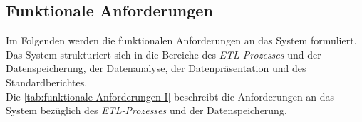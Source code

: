 

\subsection{Funktionale Anforderungen}
Im Folgenden werden die funktionalen Anforderungen an das System formuliert. Das System strukturiert sich in die Bereiche des \textit{\acrshort{ETL}-Prozesses} und der
Datenspeicherung, der Datenanalyse, der Datenpräsentation und des Standardberichtes.\\
Die \autoref{tab:funktionale Anforderungen I} beschreibt die Anforderungen an das System bezüglich des \textit{\acrshort{ETL}-Prozesses} und der Datenspeicherung.\\

